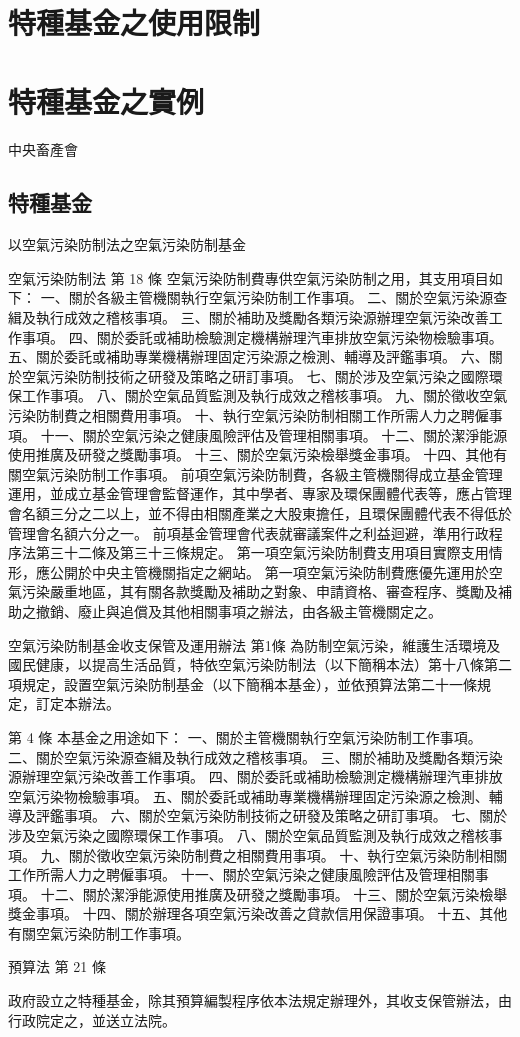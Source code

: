 \documentclass[14pt,a4paper]{article}
\begin{document}
\pagebreak

\section{特種基金之使用限制}


\pagebreak


\section{特種基金之實例}


中央畜產會

\subsection{特種基金}

以空氣污染防制法之空氣污染防制基金


空氣污染防制法
第 18 條
空氣污染防制費專供空氣污染防制之用，其支用項目如下：
一、關於各級主管機關執行空氣污染防制工作事項。
二、關於空氣污染源查緝及執行成效之稽核事項。
三、關於補助及獎勵各類污染源辦理空氣污染改善工作事項。
四、關於委託或補助檢驗測定機構辦理汽車排放空氣污染物檢驗事項。
五、關於委託或補助專業機構辦理固定污染源之檢測、輔導及評鑑事項。
六、關於空氣污染防制技術之研發及策略之研訂事項。
七、關於涉及空氣污染之國際環保工作事項。
八、關於空氣品質監測及執行成效之稽核事項。
九、關於徵收空氣污染防制費之相關費用事項。
十、執行空氣污染防制相關工作所需人力之聘僱事項。
十一、關於空氣污染之健康風險評估及管理相關事項。
十二、關於潔淨能源使用推廣及研發之獎勵事項。
十三、關於空氣污染檢舉獎金事項。
十四、其他有關空氣污染防制工作事項。
前項空氣污染防制費，各級主管機關得成立基金管理運用，並成立基金管理會監督運作，其中學者、專家及環保團體代表等，應占管理會名額三分之二以上，並不得由相關產業之大股東擔任，且環保團體代表不得低於管理會名額六分之一。
前項基金管理會代表就審議案件之利益迴避，準用行政程序法第三十二條及第三十三條規定。
第一項空氣污染防制費支用項目實際支用情形，應公開於中央主管機關指定之網站。
第一項空氣污染防制費應優先運用於空氣污染嚴重地區，其有關各款獎勵及補助之對象、申請資格、審查程序、獎勵及補助之撤銷、廢止與追償及其他相關事項之辦法，由各級主管機關定之。


空氣污染防制基金收支保管及運用辦法
第1條
為防制空氣污染，維護生活環境及國民健康，以提高生活品質，特依空氣污染防制法（以下簡稱本法）第十八條第二項規定，設置空氣污染防制基金（以下簡稱本基金），並依預算法第二十一條規定，訂定本辦法。


第 4 條
本基金之用途如下：
一、關於主管機關執行空氣污染防制工作事項。
二、關於空氣污染源查緝及執行成效之稽核事項。
三、關於補助及獎勵各類污染源辦理空氣污染改善工作事項。
四、關於委託或補助檢驗測定機構辦理汽車排放空氣污染物檢驗事項。
五、關於委託或補助專業機構辦理固定污染源之檢測、輔導及評鑑事項。
六、關於空氣污染防制技術之研發及策略之研訂事項。
七、關於涉及空氣污染之國際環保工作事項。
八、關於空氣品質監測及執行成效之稽核事項。
九、關於徵收空氣污染防制費之相關費用事項。
十、執行空氣污染防制相關工作所需人力之聘僱事項。
十一、關於空氣污染之健康風險評估及管理相關事項。
十二、關於潔淨能源使用推廣及研發之獎勵事項。
十三、關於空氣污染檢舉獎金事項。
十四、關於辦理各項空氣污染改善之貸款信用保證事項。
十五、其他有關空氣污染防制工作事項。

預算法 第 21 條

政府設立之特種基金，除其預算編製程序依本法規定辦理外，其收支保管辦法，由行政院定之，並送立法院。
\end{document}
